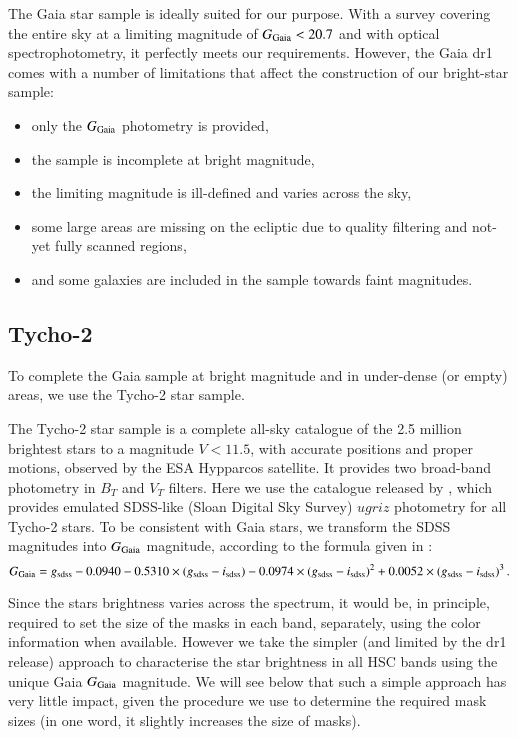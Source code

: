 \documentclass[11pt,a4paper,oneside,final]{scrartcl}
\begin{document}
The Gaia star sample is ideally suited for our purpose. With a survey covering the entire sky at a limiting magnitude of $G_{\rm Gaia} < 20.7$ and with optical spectrophotometry, it perfectly meets our requirements. However, the Gaia dr1 comes with a number of limitations that affect the construction of our bright-star sample:
\begin{itemize}
\item only the $G_{\rm Gaia}$ photometry is provided,
\item the sample is incomplete at bright magnitude,
\item the limiting magnitude is ill-defined and varies across the sky,
\item some large areas are missing on the ecliptic due to quality filtering and not-yet fully scanned regions,
\item and some galaxies are included in the sample towards faint magnitudes.
\end{itemize}

\subsection{Tycho-2}

To complete the Gaia sample at bright magnitude and in under-dense (or empty) areas, we use the Tycho-2 star sample. 

The Tycho-2 star sample \citep{Hog:2000aa} is a complete all-sky catalogue of the 2.5 million brightest stars to a magnitude $V<11.5$, with accurate positions and proper motions, observed by the ESA Hypparcos satellite. It provides two broad-band photometry in $B_{T}$ and $V_{T}$ filters. Here we use the catalogue released by \cite{Pickles:2010aa}, which provides emulated SDSS-like (Sloan Digital Sky Survey) $ugriz$ photometry for all Tycho-2 stars. To be consistent with Gaia stars, we transform the SDSS magnitudes into $G_{\rm Gaia}$ magnitude, according to the formula given in \cite{Jordi:2010aa}:
\begin{equation}
\label{eq:emulGaia}
G_{\rm Gaia} = g_{\rm sdss} - 0.0940 - 0.5310\times (g_{\rm sdss}-i_{\rm sdss}) -0.0974\times (g_{\rm sdss}-i_{\rm sdss})^2 + 0.0052\times(g_{\rm sdss}-i_{\rm sdss})^3 \, .
\end{equation}

Since the stars brightness varies across the spectrum, it would be, in principle, required to set the size of the masks in each band, separately, using the color information when available. However we take the simpler  (and limited by the dr1 release) approach to characterise the star brightness in all HSC bands using the unique Gaia $G_{\rm Gaia}$ magnitude. We will see below that such a simple approach has very little impact, given the procedure we use to determine the required mask sizes (in one word, it slightly increases the size of masks).
\end{document}
